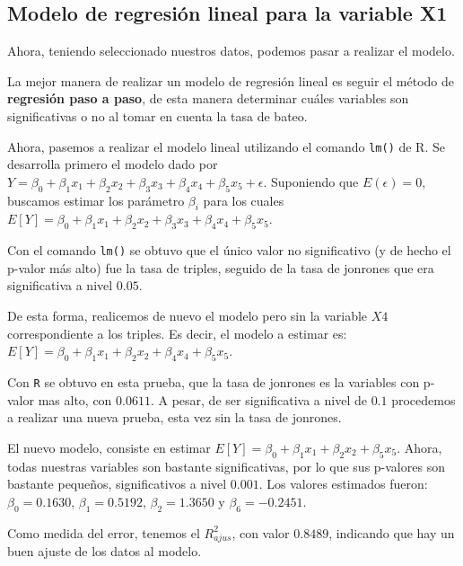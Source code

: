 \documentclass{staprojteamusb}
\begin{document}
 \hypertarget{modelo-de-regresiuxf3n-lineal-para-la-variable-x1}{%
 \subsection{Modelo de regresión lineal para la variable X1}\label{modelo-de-regresiuxf3n-lineal-para-la-variable-x1}}

 Ahora, teniendo seleccionado nuestros datos, podemos pasar a realizar el modelo.

 La mejor manera de realizar un modelo de regresión lineal es seguir el método de \textbf{regresión paso a paso}, de esta manera determinar cuáles variables son significativas o no al tomar en cuenta la tasa de bateo.

 Ahora, pasemos a realizar el modelo lineal utilizando el comando \texttt{lm()} de R. Se desarrolla primero el modelo dado por \(Y=\beta_{0}+\beta_{1}x_{1}+\beta_{2}x_{2}+\beta_{3}x_{3}+\beta_{4}x_{4}+\beta_{5}x_{5}+\epsilon\). Suponiendo que \linebreak \(E(\epsilon)=0\), buscamos estimar los parámetro \(\beta_{i}\) para los cuales \(E[Y]=\beta_{0}+\beta_{1}x_{1}+\beta_{2}x_{2}+\beta_{3}x_{3}+\beta_{4}x_{4}+\beta_{5}x_{5}\).

 Con el comando \texttt{lm()} se obtuvo que el único valor no significativo (y de hecho el p-valor más alto) fue la tasa de triples, seguido de la tasa de jonrones que era significativa a nivel \(0.05\).

 De esta forma, realicemos de nuevo el modelo pero sin la variable \(X4\) correspondiente a los triples. Es decir, el modelo a estimar es: \(E[Y]=\beta_{0}+\beta_{1}x_{1}+\beta_{2}x_{2}+\beta_{4}x_{4}+\beta_{5}x_{5}\).

 Con \texttt{R} se obtuvo en esta prueba, que la tasa de jonrones es la variables con p-valor mas alto, con \(0.0611\). A pesar, de ser significativa a nivel de \(0.1\) procedemos a realizar una nueva prueba, esta vez sin la tasa de jonrones.

 El nuevo modelo, consiste en estimar \(E[Y]=\beta_{0}+\beta_{1}x_{1}+\beta_{2}x_{2}+\beta_{5}x_{5}\). Ahora, todas nuestras variables son bastante significativas, por lo que sus p-valores son bastante pequeños, significativos a nivel \(0.001\). Los valores estimados fueron: \(\beta_{0}=0.1630\), \(\beta_{1}=0.5192\), \(\beta_{2}=1.3650\) y \(\beta_{6}=-0.2451\).

 Como medida del error, tenemos el \(R^{2}_{ajus}\), con valor \(0.8489\), indicando que hay un buen ajuste de los datos al modelo.
\end{document}
